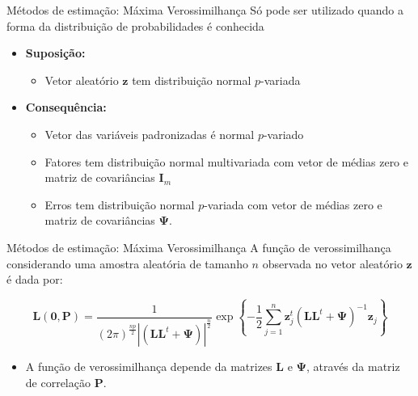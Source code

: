 \documentclass[
  ignorenonframetext,
  aspectratio=169,
]{beamer}
\providecommand{\tightlist}{%
  \setlength{\itemsep}{0pt}\setlength{\parskip}{0pt}}
\begin{document}
\begin{frame}{Métodos de estimação: Máxima Verossimilhança}
\label{muxe9todos-de-estimauxe7uxe3o-muxe1xima-verossimilhanuxe7a}
Só pode ser utilizado quando a forma da distribuição de probabilidades é
conhecida

\bigskip

\begin{itemize}
\tightlist
\item
  \textbf{Suposição:}

  \begin{itemize}
  \tightlist
  \item
    Vetor aleatório \(\boldsymbol{z}\) tem distribuição normal
    \(p\)-variada
  \end{itemize}
\end{itemize}

\pause

\begin{itemize}
\tightlist
\item
  \textbf{Consequência:}

  \begin{itemize}
  \tightlist
  \item
    Vetor das variáveis padronizadas é normal \(p\)-variado
  \item
    Fatores tem distribuição normal multivariada com vetor de médias
    zero e matriz de covariâncias \(\boldsymbol{I}_m\)
  \item
    Erros tem distribuição normal \(p\)-variada com vetor de médias zero
    e matriz de covariâncias \(\boldsymbol{\Psi}\).
  \end{itemize}
\end{itemize}
\end{frame}

\begin{frame}{Métodos de estimação: Máxima Verossimilhança}
\label{muxe9todos-de-estimauxe7uxe3o-muxe1xima-verossimilhanuxe7a-1}
A função de verossimilhança considerando uma amostra aleatória de
tamanho \(n\) observada no vetor aleatório \(\boldsymbol{z}\) é dada
por:

\[
\boldsymbol{L}(\boldsymbol{0},\boldsymbol{P}) =  \displaystyle \frac{1}{(2\pi)^{\frac{np}{2}} |(\boldsymbol{L} \boldsymbol{L}^t + \boldsymbol{\Psi})|^{\frac{n}{2}}} \exp \left\{-\frac{1}{2} \displaystyle \sum_{j=1}^n \boldsymbol{z}_j^t (\boldsymbol{L}\boldsymbol{L}^t + \boldsymbol{\Psi})^{-1} \boldsymbol{z}_j  \right\} 
\]

\pause

\begin{itemize}
\tightlist
\item
  A função de verossimilhança depende da matrizes \(\boldsymbol{L}\) e
  \(\boldsymbol{\Psi}\), através da matriz de correlação
  \(\boldsymbol{P}\).
\end{itemize}
\end{frame}
\end{document}
